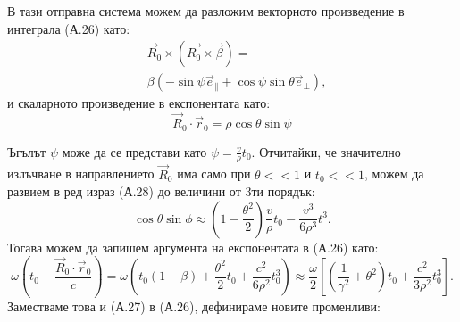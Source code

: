 \begin{appendices}
\begin{minipage}{15em}
	
	\captionsetup{font=footnotesize}
	\label{Emission_Frame_2}
	
\end{minipage}
\begin{minipage}{18em}
В тази отправна система можем да разложим векторното произведение в интеграла (А.26) като:
\begin{equation}
	\begin{split}
	&\vec{R}_0\times(\vec{R_0}\times\vec{\beta}) = \\
	&\beta(-\sin\psi \vec{e}_\parallel + \cos\psi\sin\theta \vec{e}_\perp),
	\end{split}
\end{equation}
и скаларното произведение в експонентата като:
\begin{equation}
	\vec{R}_0\cdot\vec{r}_0 = \rho\cos\theta\sin\psi
\end{equation}
\end{minipage}
Ъгълът $\psi$ може да се представи като $\psi = \frac{v}{\rho}t_0$. Отчитайки, че значително излъчване в направлението $\vec{R}_0$ има само при $\theta << 1$ и $t_0 << 1$, можем да развием в ред израз (А.28) до величини от 3ти порядък:
\begin{equation}
	\cos\theta\sin\phi \approx \left(1 - \frac{\theta^2}{2}\right)\frac{v}{\rho}t_0 - \frac{v^3}{6\rho^3}t^3.
\end{equation}
Тогава можем да запишем аргумента на експонентата в (А.26) като:
\begin{equation*}
	\omega\left(t_0 - \frac{\vec{R}_0\cdot\vec{r}_0}{c}\right) = \omega\left(t_0(1-\beta) + \frac{\theta^2}{2}t_0 + \frac{c^2}{6\rho^2}t_0^3\right)\approx\frac{\omega}{2}\left[\left(\frac{1}{\gamma^2} + \theta^2\right)t_0 + \frac{c^2}{3\rho^2}t_0^3\right].
\end{equation*}
Заместваме това и (А.27) в (А.26), дефинираме новите променливи:

\end{appendices}
